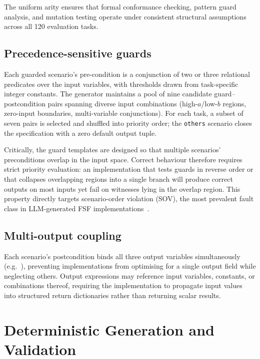 The uniform arity ensures that formal conformance checking, pattern guard
analysis, and mutation testing operate under consistent structural assumptions
across all 120 evaluation tasks.

\subsection{Precedence-sensitive guards}

Each guarded scenario's pre-condition is a conjunction of two or three
relational predicates over the input variables, with thresholds drawn from
task-specific integer constants.  The generator maintains a pool of nine
candidate guard--postcondition pairs spanning diverse input combinations
(high-$a$/low-$b$ regions, zero-input boundaries, multi-variable conjunctions).
For each task, a subset of seven pairs is selected and shuffled into priority
order; the \texttt{others} scenario closes the specification with a zero
default output tuple.

Critically, the guard templates are designed so that multiple scenarios'
preconditions overlap in the input space.  Correct behaviour therefore
requires strict priority evaluation: an implementation that tests guards in
reverse order or that collapses overlapping regions into a single branch will
produce correct outputs on most inputs yet fail on witnesses lying in the
overlap region.  This property directly targets scenario-order violation
(SOV), the most prevalent fault class in LLM-generated FSF implementations~\citep{dakhel2023copilot,chen2021codex}.

\subsection{Multi-output coupling}

Each scenario's postcondition binds all three output variables simultaneously
(e.g.\ ), preventing
implementations from optimising for a single output field while neglecting
others.  Output expressions may reference input variables, constants, or
combinations thereof, requiring the implementation to propagate input values
into structured return dictionaries rather than returning scalar results.

\section{Deterministic Generation and Validation}
\label{sec:bench:validation}

